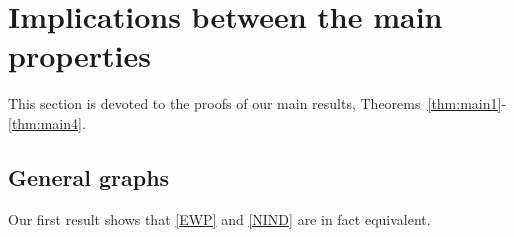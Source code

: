 \documentclass{article}
\theoremstyle{plain}
\theoremstyle{definition}
\begin{document}
\section{Implications between the main properties}
\label{sec:impliations}

This section is devoted to the proofs of our main results, Theorems~\ref{thm:main1}-\ref{thm:main4}. 

\subsection{General graphs}
\label{sec:general}

Our first result shows that \ref{EWP} and \ref{NIND} are in fact equivalent.
\end{document}
